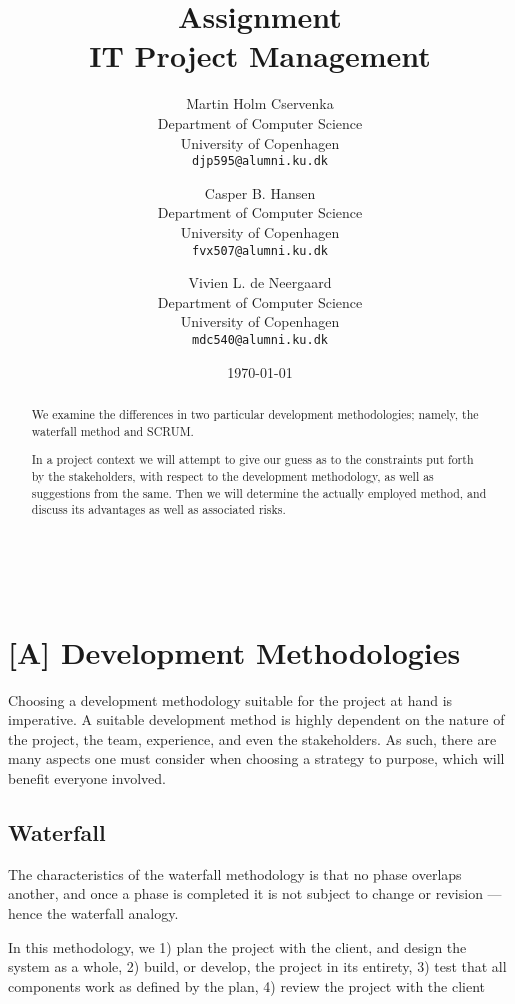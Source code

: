 \documentclass[11pt]{article}
\title
{
    Assignment \assignmentnumber\\
    {\large IT Project Management}
}
\author
{
    Martin Holm Cservenka\\
    Department of Computer Science\\
    University of Copenhagen\\
    {\tt djp595@alumni.ku.dk}
    \and
    Casper B. Hansen\\
    Department of Computer Science\\
    University of Copenhagen\\
    {\tt fvx507@alumni.ku.dk}
    \and
    Vivien L. de Neergaard\\
    Department of Computer Science\\
    University of Copenhagen\\
    {\tt mdc540@alumni.ku.dk}
}
\date{\today}
\newcommand{\colbreak}{\vfill{\ }\columnbreak}
\begin{document}
\maketitle
\begin{multicols}{2}
    \begin{abstract}
    We examine the differences in two particular development methodologies; namely, the waterfall method and SCRUM.
    
    In a project context we will attempt to give our guess as to the constraints put forth by the stakeholders, with respect to the development methodology, as well as suggestions from the same. Then we will determine the actually employed method, and discuss its advantages as well as associated risks.
    \end{abstract}
\colbreak
    \tableofcontents
\end{multicols}
\thispagestyle{empty}
\clearpage

\section{[A] Development Methodologies}
\label{sec:A}
Choosing a development methodology suitable for the project at hand is imperative. A suitable development method is highly dependent on the nature of the project, the team, experience, and even the stakeholders. As such, there are many aspects one must consider when choosing a strategy to purpose, which will benefit everyone involved.

\subsection{Waterfall}
\label{sec:A|sub:waterfall}
The characteristics of the waterfall methodology is that no phase overlaps another, and once a phase is completed it is not subject to change or revision --- hence the waterfall analogy.

In this methodology, we 1) plan the project with the client, and design the system as a whole, 2) build, or develop, the project in its entirety, 3) test that all components work as defined by the plan, 4) review the project with the client

%
%


  
\end{document}
